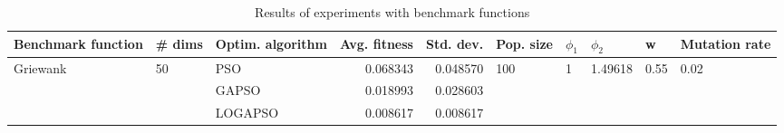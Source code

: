 \begin{table}
\centering
\caption{Results of experiments with benchmark functions}
\begin{tabular}{lllrrlllll}
\toprule
       Benchmark function &             \# dims & Optim. algorithm &  Avg. fitness &  Std. dev. &            Pop. size &         $\phi_{1}$ &               $\phi_{2}$ &                     w &         Mutation rate \\
\midrule
\multirow{3}{*}{Griewank} & \multirow{3}{*}{50} &              PSO &      0.068343 &   0.048570 & \multirow{3}{*}{100} & \multirow{3}{*}{1} & \multirow{3}{*}{1.49618} & \multirow{3}{*}{0.55} & \multirow{3}{*}{0.02} \\
                          &                     &            GAPSO &      0.018993 &   0.028603 &                      &                    &                          &                       &                       \\
                          &                     &          LOGAPSO &      0.008617 &   0.008617 &                      &                    &                          &                       &                       \\
\bottomrule
\end{tabular}
\end{table}
